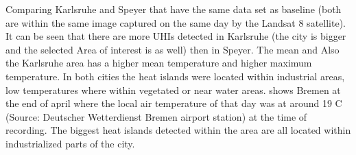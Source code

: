 \documentclass[a4paper, english]{article}
\begin{document}
%
Comparing Karlsruhe and Speyer that have the same data set as baseline (both are within the same image captured on the same day by the Landsat 8 satellite).
It can be seen that there are more \acp{UHI} detected in Karlsruhe (the city is bigger and the selected Area of interest is as well) then in Speyer. 
The mean and 
Also the Karlsruhe area has a higher mean temperature and higher maximum temperature. 
In both cities the heat islands were located within industrial areas, low temperatures where within vegetated or near water areas.
 shows Bremen at the end of april where the local air temperature of that day was at around 19 \textdegree C (Source: Deutscher Wetterdienst Bremen airport station) at the time of recording. 
The biggest heat islands detected within the area are all located within industrialized parts of the city. 

%
\end{document}
